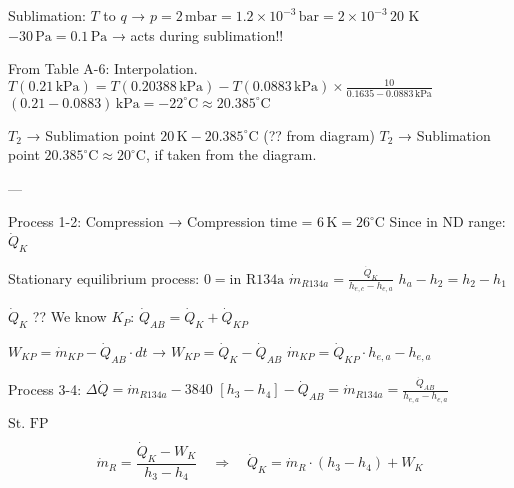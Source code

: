 Sublimation: \( T \) to \( q \) → \( p = 2 \, \text{mbar} = 1.2 \times 10^{-3} \, \text{bar} = 2 \times 10^{-3} \, \text{20 K} \)  
\( -30 \, \text{Pa} = 0.1 \, \text{Pa} \) → acts during sublimation!!  

From Table A-6: Interpolation.  
\( T(0.21 \, \text{kPa}) = T(0.20388 \, \text{kPa}) - T(0.0883 \, \text{kPa}) \times \frac{10}{0.1635 - 0.0883 \, \text{kPa}} \)  
\( (0.21 - 0.0883) \, \text{kPa} = -22^\circ \text{C} \approx 20.385^\circ \text{C} \)  

\( T_2 \) → Sublimation point \( 20 \, \text{K} - 20.385^\circ \text{C} \) (?? from diagram)  
\( T_2 \) → Sublimation point \( 20.385^\circ \text{C} \approx 20^\circ \text{C} \), if taken from the diagram.  

---

Process 1-2: Compression → Compression time = \( 6 \, \text{K} = 26^\circ \text{C} \)  
Since in ND range: \( \dot{Q}_K \)  

Stationary equilibrium process: \( 0 = \text{in R134a} \)  
\( \dot{m}_{R134a} = \frac{\dot{Q}_K}{h_{e,c} - h_{e,a}} \)  
\( h_a - h_2 = h_2 - h_1 \)  

\( \dot{Q}_K \) ?? We know \( K_P \):  
\( \dot{Q}_{AB} = \dot{Q}_K + \dot{Q}_{KP} \)  

\( W_{KP} = \dot{m}_{KP} - \dot{Q}_{AB} \cdot dt \) → \( W_{KP} = \dot{Q}_K - \dot{Q}_{AB} \)  
\( \dot{m}_{KP} = \dot{Q}_{KP} \cdot h_{e,a} - h_{e,a} \)  

Process 3-4: \( \Delta \dot{Q} = \dot{m}_{R134a} - 3840 \)  
\( [h_3 - h_4] - \dot{Q}_{AB} = \dot{m}_{R134a} = \frac{\dot{Q}_{AB}}{h_{e,a} - h_{e,a}} \)  

\( \text{St. FP} \)

\[
\dot{m}_R = \frac{\dot{Q}_K - W_K}{h_3 - h_4} \quad \Rightarrow \quad \dot{Q}_K = \dot{m}_R \cdot (h_3 - h_4) + W_K
\]